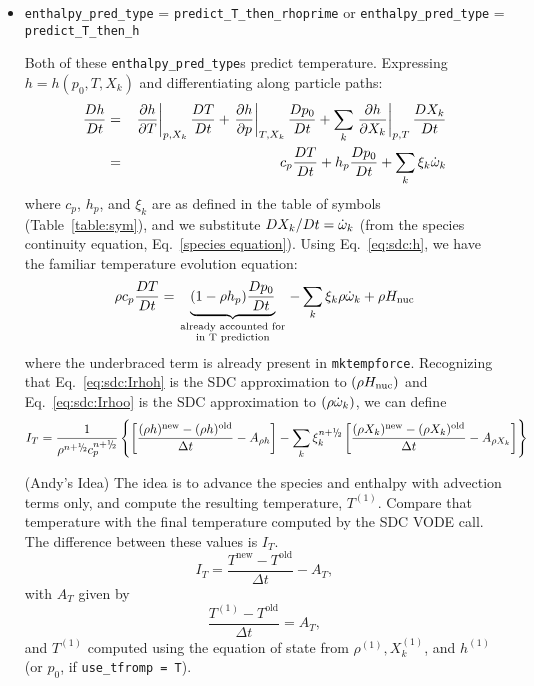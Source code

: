 \begin{itemize}
\item {\tt enthalpy\_pred\_type} = {\tt predict\_T\_then\_rhoprime} or 
      {\tt enthalpy\_pred\_type} = {\tt predict\_T\_then\_h} 

Both of these {\tt enthalpy\_pred\_type}s predict temperature.  Expressing
$h = h(p_0,T,X_k)$ and differentiating along particle paths:
\begin{eqnarray}
\frac{Dh}{Dt} &=& \left . \frac{\partial h}{\partial T} \right |_{p,X_k} \frac{DT}{Dt} +
                  \left . \frac{\partial h}{\partial p} \right |_{T,X_k} \frac{Dp_0}{Dt} +
           \sum_k \left . \frac{\partial h}{\partial X_k} \right |_{p,T} \frac{DX_k}{Dt} \\
              &=& c_p \frac{DT}{Dt} + h_p  \frac{Dp_0}{Dt} + \sum_k \xi_k \dot{\omega}_k
\end{eqnarray}
where $c_p$, $h_p$, and $\xi_k$ are as defined in the table of symbols
(Table~\ref{table:sym}), and we substitute $DX_k/Dt = \dot{\omega}_k$ (from the species
continuity equation, Eq.~\ref{species equation}).  Using Eq.~\ref{eq:sdc:h}, we have
the familiar temperature evolution equation:
\begin{equation}
\rho c_p \frac{DT}{Dt} = \underbrace{(1 - \rho h_p) \frac{Dp_0}{Dt}}_{\begin{smallmatrix}\text{already~accounted~for} \\ \text{in~T~prediction}\end{smallmatrix}} - \sum_k \xi_k \rho \dot{\omega}_k + \rho {H_{\rm nuc}}
\end{equation}
where the underbraced term is already present in {\tt mktempforce}.  Recognizing that
Eq.~\ref{eq:sdc:Irhoh} is the SDC approximation to $(\rho {H_{\rm nuc}})$ and Eq.~\ref{eq:sdc:Irhoo} is the 
SDC approximation to $(\rho \dot{\omega}_k)$, we can define
\begin{equation}
I_T = \frac{1}{\rho^{n+\myhalf} c_p^{n+\myhalf}} \left \{
  \left [ \frac{(\rho h)^\mathrm{new} - (\rho h)^\mathrm{old}}{\Delta t} - A_{\rho h} \right ]
  - \sum_k \xi_k^{n+\myhalf} \left [      \frac{(\rho X_k)^\mathrm{new} - 
            (\rho X_k)^\mathrm{old}}{\Delta t} - A_{\rho X_k}  \right ] \right \}
\end{equation}

(Andy's Idea) The idea is to advance the species and enthalpy with advection
terms only, and compute the resulting temperature, $T^{(1)}$.  Compare that temperature
with the final temperature computed by the SDC VODE call.  The difference
between these values is $I_T$.
\begin{equation}
I_T = \frac{T^\mathrm{new} - T^\mathrm{old}}{\Delta t} - A_T,
\end{equation}
with $A_T$ given by
\begin{equation}
\frac{T^{(1)} - T^\mathrm{old}}{\Delta t} = A_T,
\end{equation}
and $T^{(1)}$ computed using the equation of state from $\rho^{(1)}, X_k^{(1)}$, 
and $h^{(1)}$ (or $p_0$, if {\tt use\_tfromp = T}).
\end{itemize}


